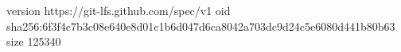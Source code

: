 version https://git-lfs.github.com/spec/v1
oid sha256:6f3f4c7b3c08e640e8d01c1b6d047d6ca8042a703dc9d24c5e6080d441b80b63
size 125340
